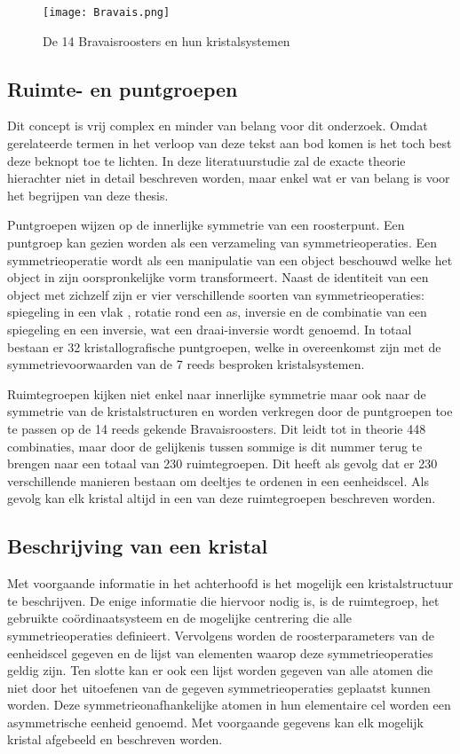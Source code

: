\begin{figure}[H]
\texttt{[image: Bravais.png]}
\caption{De 14 Bravaisroosters en hun kristalsystemen}
\end{figure}

\subsection{Ruimte- en puntgroepen}
Dit concept is vrij complex en minder van belang voor dit onderzoek. Omdat gerelateerde termen in het verloop van deze tekst aan bod komen is het toch best deze beknopt toe te lichten. In deze literatuurstudie zal de exacte theorie hierachter niet in detail beschreven worden, maar enkel wat er van belang is voor het begrijpen van deze thesis.

\par
Puntgroepen wijzen op de innerlijke symmetrie van een roosterpunt. Een puntgroep kan gezien worden als een verzameling van symmetrieoperaties. Een symmetrieoperatie wordt als een manipulatie van een object beschouwd welke het object in zijn oorspronkelijke vorm transformeert. Naast de identiteit van een object met zichzelf zijn er vier verschillende soorten van symmetrieoperaties: spiegeling in een vlak , rotatie rond een as, inversie en de combinatie van een spiegeling en een inversie, wat een draai-inversie wordt genoemd. In totaal bestaan er 32 kristallografische puntgroepen, welke in overeenkomst zijn met de symmetrievoorwaarden van de 7 reeds besproken kristalsystemen. 

\par
Ruimtegroepen kijken niet enkel naar innerlijke symmetrie maar ook naar de symmetrie van de kristalstructuren en worden verkregen door de puntgroepen toe te passen op de 14 reeds gekende Bravaisroosters. Dit leidt tot in theorie 448 combinaties, maar door de gelijkenis tussen sommige is dit nummer terug te brengen naar een totaal van 230 ruimtegroepen. Dit heeft als gevolg dat er 230 verschillende manieren bestaan om deeltjes te ordenen in een eenheidscel. Als gevolg kan elk kristal altijd in een van deze ruimtegroepen beschreven worden. 

\subsection{Beschrijving van een kristal}
Met voorgaande informatie in het achterhoofd is het mogelijk een kristalstructuur te beschrijven. De enige informatie die hiervoor nodig is, is de ruimtegroep, het gebruikte coördinaatsysteem en de mogelijke centrering die alle symmetrieoperaties definieert. Vervolgens worden de roosterparameters van de eenheidscel gegeven en de lijst van elementen waarop deze symmetrieoperaties geldig zijn. Ten slotte kan er ook een lijst worden gegeven van alle atomen die niet door het uitoefenen van de gegeven symmetrieoperaties geplaatst kunnen worden. Deze symmetrieonafhankelijke atomen in hun elementaire cel worden een asymmetrische eenheid genoemd. Met voorgaande gegevens kan elk mogelijk kristal afgebeeld en beschreven worden. 

